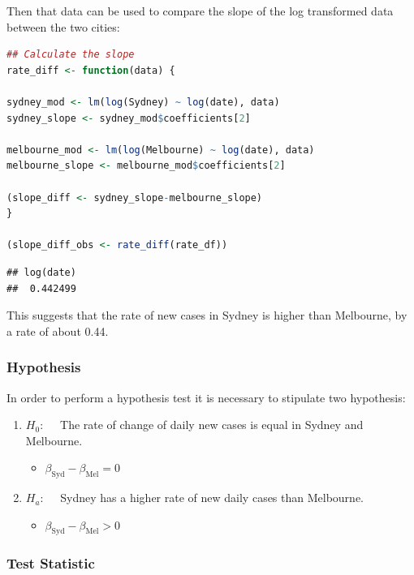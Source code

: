 \documentclass{article}
\providecommand{\tightlist}{%
  \setlength{\itemsep}{0pt}\setlength{\parskip}{0pt}}
\begin{document}
Then that data can be used to compare the slope of the log transformed
data between the two cities:

\begin{lstlisting}[language=R]
## Calculate the slope
rate_diff <- function(data) {
  
sydney_mod <- lm(log(Sydney) ~ log(date), data)
sydney_slope <- sydney_mod$coefficients[2]

melbourne_mod <- lm(log(Melbourne) ~ log(date), data)
melbourne_slope <- melbourne_mod$coefficients[2]

(slope_diff <- sydney_slope-melbourne_slope)
}

(slope_diff_obs <- rate_diff(rate_df))
\end{lstlisting}

\begin{lstlisting}
## log(date) 
##  0.442499
\end{lstlisting}

This suggests that the rate of new cases in Sydney is higher than
Melbourne, by a rate of about 0.44.

\hypertarget{hypothesis-1}{%
\subsubsection{Hypothesis}\label{hypothesis-1}}

In order to perform a hypothesis test it is necessary to stipulate two
hypothesis:

\begin{enumerate}
\def\labelenumi{\arabic{enumi}.}
\tightlist
\item
  \(H_0: \quad\) The rate of change of daily new cases is equal in
  Sydney and Melbourne.

  \begin{itemize}
  \tightlist
  \item
    \(\beta_\mathrm{Syd} - \beta_\mathrm{Mel} = 0\)
  \end{itemize}
\item
  \(H_a: \quad\) Sydney has a higher rate of new daily cases than
  Melbourne.

  \begin{itemize}
  \tightlist
  \item
    \(\beta_\mathrm{Syd} - \beta_\mathrm{Mel} > 0\)
  \end{itemize}
\end{enumerate}

\hypertarget{test-statistic-1}{%
\subsubsection{Test Statistic}\label{test-statistic-1}}
\end{document}
